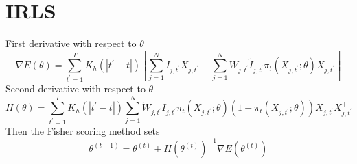 \documentclass[11pt]{amsart}
\numberwithin{equation}{section}
\theoremstyle{plain}
\begin{document}

\section{IRLS}

First derivative with respect to $\theta$
$$
\nabla E(\theta) = \sum_{t^\prime=1}^T K_h(|t^\prime - t|) \left[ \sum_{j=1}^N I_{j,t^\prime} X_{j,t^\prime} + \sum_{j=1}^N \tilde W_{j,t^\prime} \tilde I_{j,t^\prime} \pi_t (X_{j,t^\prime}; \theta) X_{j,t^\prime} \right]
$$
Second derivative with respect to $\theta$
$$
H(\theta) = \sum_{t^\prime=1}^T K_h(|t^\prime - t|) \sum_{j=1}^N \tilde W_{j,t^\prime} \tilde I_{j,t^\prime} \pi_t (X_{j,t^\prime}; \theta) \left( 1- \pi_t (X_{j,t^\prime}; \theta) \right) X_{j,t^\prime} X_{j,t^\prime}^\top
$$
Then the Fisher scoring method sets
$$
\theta^{(t+1)} = \theta^{(t)} + H \left(\theta^{(t)} \right)^{-1} \nabla E \left(\theta^{(t)} \right)
$$
\end{document}
